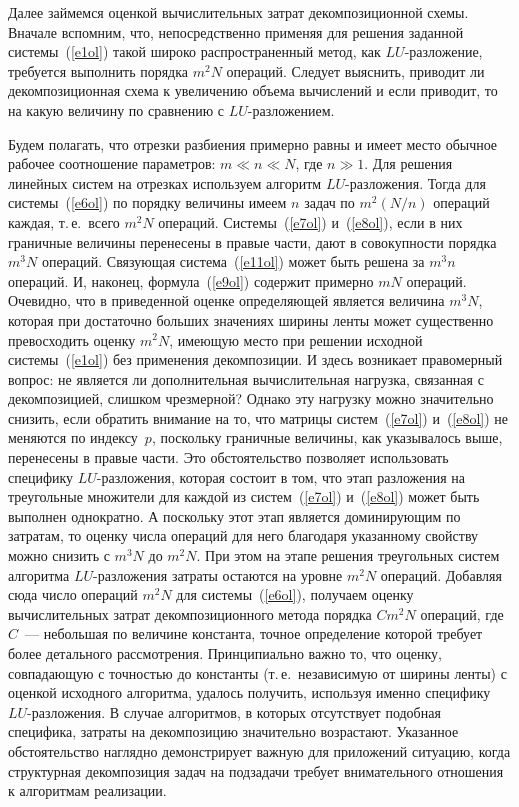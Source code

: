 \begin{multicols}{2}
     Далее займемся оценкой вычислительных затрат декомпозиционной
схемы. Вначале вспомним, что, непосредственно применяя для решения
заданной системы~(\ref{e1ol}) такой широко распространенный метод, как
$LU$-разложение, требуется выполнить порядка $m^2N$ операций. Следует
выяснить, приводит ли декомпозиционная схема к увеличению объема
вычислений и если приводит, то на какую величину по сравнению с
     $LU$-разложением.

     Будем полагать, что отрезки разбиения примерно равны и имеет место
обычное рабочее соотношение параметров: $m \ll n \ll N$, где $n \gg 1$. Для
решения линейных систем на отрезках используем алгоритм
     $LU$-разложения. Тогда для системы~(\ref{e6ol}) по порядку величины
имеем $n$ задач по $m^2(N/n)$ операций каждая, т.\,е.\ всего $m^2N$ операций.
Сис\-те\-мы~(\ref{e7ol}) и~(\ref{e8ol}), если в них граничные величины
перенесены в правые части, дают в совокупности порядка $m^3N$ операций.
Связующая система~(\ref{e11ol}) может быть решена за $m^3n$ операций. И,
наконец, формула~(\ref{e9ol}) содержит примерно $mN$ операций. Очевидно,
что в приведенной оценке определяющей является величина $m^3N$, которая
при достаточно больших значениях ширины ленты может существенно
превосходить оценку $m^2N$, име\-ющую место при решении исходной
системы~(\ref{e1ol}) без применения декомпозиции. И здесь возникает
правомерный вопрос: не является ли дополнительная вычислительная
нагрузка, связанная с декомпозицией, слишком чрезмерной? Однако эту
нагрузку можно значительно снизить, если обратить внимание на то, что
матрицы систем~(\ref{e7ol}) и~(\ref{e8ol}) не меняются по
индексу~$p$, поскольку граничные величины, как указывалось выше,
перенесены в правые части. Это обстоятельство позволяет использовать
специфику $LU$-разложения, которая состоит в том, что этап разложения на
треугольные множители для каждой из систем~(\ref{e7ol}) и~(\ref{e8ol}) может
быть выполнен однократно. А поскольку этот этап является доми\-ни\-ру\-ющим
по затратам, то оценку числа операций для него благодаря указанному
свойству можно снизить с $m^3N$ до $m^2N$. При этом на этапе решения
треугольных систем алгоритма $LU$-разложения затраты остаются на уровне
$m^2N$ операций. До\-бав\-ляя сюда число операций $m^2N$ для
системы~(\ref{e6ol}), получаем оценку вычислительных затрат
декомпозиционного метода порядка $Cm^2N$ операций, где $C$~---
небольшая по величине константа, точное определение которой требует более
детального рассмотрения. Принципиально важно то, что оценку,
совпадающую с точностью до константы (т.\,е.\ независимую от ширины
ленты) с оценкой исходного алгоритма, удалось получить, используя именно
специфику $LU$-разложения. В случае алгоритмов, в которых отсутствует
подобная специфика, затраты на декомпозицию значительно возрастают.
Указанное обстоятельство наглядно демонстрирует важную для приложений
ситуацию, когда структурная декомпозиция задач на подзадачи требует
внимательного отношения к алгоритмам реализации.


\end{multicols}
